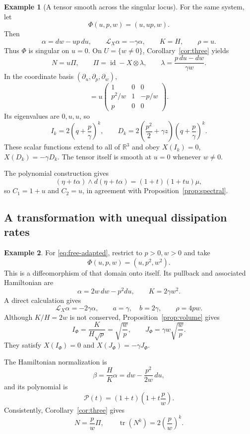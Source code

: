 \documentclass[11pt,a4paper]{article}
\numberwithin{equation}{section}
\theoremstyle{definition}
\newtheorem{example}{Example}
\theoremstyle{remark}
\newcommand{\id}{\operatorname{id}}
\newcommand{\tr}{\operatorname{tr}}
\begin{document}
\begin{example}[A tensor smooth across the singular locus]
For the same system, let
\[
\Phi(u,p,w)=(u,up,w).
\]
Then
\[
\alpha=dw-up\,du,\qquad
\mathcal L_X\alpha=-\gamma\alpha,\qquad
K=H,\qquad \rho=u.
\]
Thus $\Phi$ is singular on $u=0$.
On $U=\{w\neq0\}$, Corollary~\ref{cor:three} yields
\[
N=u\Pi,\qquad
\Pi=\id-X\otimes\lambda,\qquad
\lambda=\frac{p\,du-dw}{\gamma w}.
\]
In the coordinate basis $(\partial_u,\partial_p,\partial_w)$,
\begin{equation}
[N]=u
\begin{pmatrix}
1&0&0\\
p^2/w&1&-p/w\\
p&0&0
\end{pmatrix}.
\label{eq:free-N}
\end{equation}
Its eigenvalues are $0,u,u$, so
\[
I_k=2\left(q+\frac p\gamma\right)^k,\qquad
D_k=2\left(\frac{p^2}{2}+\gamma z\right)
\left(q+\frac p\gamma\right)^k.
\]
These scalar functions extend to all of $\mathbb R^3$
and obey $X(I_k)=0$, $X(D_k)=-\gamma D_k$.
The tensor itself is smooth at $u=0$ whenever $w\neq0$.

The polynomial construction gives
\[
(\eta+t\alpha)\wedge d(\eta+t\alpha)
=(1+t)(1+tu)\mu,
\]
so $C_1=1+u$ and $C_2=u$, in agreement with
Proposition~\ref{prop:spectral}.
\end{example}



\subsection{A transformation with unequal dissipation rates}

\begin{example}
For \eqref{eq:free-adapted}, restrict to $p>0,w>0$
and take
\[
\Phi(u,p,w)=(u,p^2,w^2).
\]
This is a diffeomorphism of that domain onto itself.
Its pullback and associated Hamiltonian are
\[
\alpha=2w\,dw-p^2du,\qquad K=2\gamma w^2.
\]
A direct calculation gives
\[
\mathcal L_X\alpha=-2\gamma\alpha,\qquad
a=\gamma,\quad b=2\gamma,\qquad
\rho=4pw.
\]
Although $K/H=2w$ is not conserved,
Proposition~\ref{prop:volume} gives
\[
I_\Phi=\frac{K}{H\sqrt{\rho}}
=\sqrt{\frac wp},
\qquad
J_\Phi=\gamma w\sqrt{\frac wp}.
\]
They satisfy $X(I_\Phi)=0$ and
$X(J_\Phi)=-\gamma J_\Phi$.

The Hamiltonian normalization is
\[
\beta=\frac HK\alpha
=dw-\frac{p^2}{2w}\,du,
\]
and its polynomial is
\[
\mathcal P(t)=(1+t)\left(1+t\frac pw\right).
\]
Consistently, Corollary~\ref{cor:three} gives
\[
N=\frac pw \Pi,\qquad
\tr(N^k)=2\left(\frac pw\right)^k.
\]
\end{example}
\end{document}
